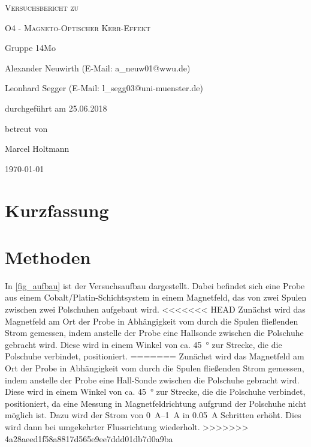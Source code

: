 \documentclass[
	a4paper,
	12pt,
	pagesize,
	ngerman
]{scrartcl}
\begin{document}
	
	\begin{titlepage}
		\centering
		{\scshape\LARGE Versuchsbericht zu \par}
		\vspace{1cm}
		{\scshape\huge O4 - Magneto-Optischer Kerr-Effekt \par}
		\vspace{2.5cm}
		{\LARGE Gruppe 14Mo \par}
		\vspace{0.5cm}
		
		{\large Alexander Neuwirth (E-Mail: a\_neuw01@wwu.de) \par}
		{\large Leonhard Segger (E-Mail: l\_segg03@uni-muenster.de) \par}
		\vfill
		
		durchgeführt am 25.06.2018\par
		betreut von\par
		{\large Marcel Holtmann} %
		
		\vfill
		
		{\large \today\par}
	\end{titlepage}
	\tableofcontents
	\newpage


	\section{Kurzfassung}
	
	\section{Methoden}
	In \cref{fig_aufbau} ist der Versuchsaufbau dargestellt.
	Dabei befindet sich eine Probe aus einem Cobalt/Platin-Schichtsystem in einem Magnetfeld, das von zwei Spulen zwischen zwei Polschuhen aufgebaut wird.
<<<<<<< HEAD
	Zunächst wird das Magnetfeld am Ort der Probe in Abhängigkeit vom durch die Spulen fließenden Strom gemessen, indem anstelle der Probe eine Hallsonde zwischen die Polschuhe gebracht wird.
	Diese wird in einem Winkel von ca. \SI{45}{\degree} zur Strecke, die die Polschuhe verbindet, positioniert. 	
=======
	Zunächst wird das Magnetfeld am Ort der Probe in Abhängigkeit vom durch die Spulen fließenden Strom gemessen, indem anstelle der Probe eine Hall-Sonde zwischen die Polschuhe gebracht wird.
	Diese wird in einem Winkel von ca. \SI{45}{\degree} zur Strecke, die die Polschuhe verbindet, positioniert, da eine Messung in Magnetfeldrichtung aufgrund der Polschuhe nicht möglich ist.
	Dazu wird der Strom von \SIrange{0}{1}{\ampere} in \SI{0,05}{\ampere} Schritten erhöht.
	Dies wird dann bei umgekehrter Flussrichtung wiederholt.
>>>>>>> 4a28aeed1f58a8817d565e9ee7ddd01db7d0a9ba
\end{document}
